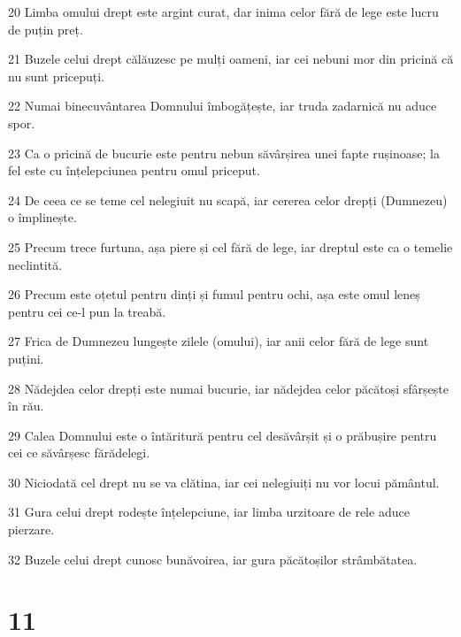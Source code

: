 \par 20 Limba omului drept este argint curat, dar inima celor fără de lege este lucru de puțin preț.
\par 21 Buzele celui drept călăuzesc pe mulți oameni, iar cei nebuni mor din pricină că nu sunt pricepuți.
\par 22 Numai binecuvântarea Domnului îmbogățește, iar truda zadarnică nu aduce spor.
\par 23 Ca o pricină de bucurie este pentru nebun săvârșirea unei fapte rușinoase; la fel este cu înțelepciunea pentru omul priceput.
\par 24 De ceea ce se teme cel nelegiuit nu scapă, iar cererea celor drepți (Dumnezeu) o împlinește.
\par 25 Precum trece furtuna, așa piere și cel fără de lege, iar dreptul este ca o temelie neclintită.
\par 26 Precum este oțetul pentru dinți și fumul pentru ochi, așa este omul leneș pentru cei ce-l pun la treabă.
\par 27 Frica de Dumnezeu lungește zilele (omului), iar anii celor fără de lege sunt puțini.
\par 28 Nădejdea celor drepți este numai bucurie, iar nădejdea celor păcătoși sfârșește în rău.
\par 29 Calea Domnului este o întăritură pentru cel desăvârșit și o prăbușire pentru cei ce săvârșesc fărădelegi.
\par 30 Niciodată cel drept nu se va clătina, iar cei nelegiuiți nu vor locui pământul.
\par 31 Gura celui drept rodește înțelepciune, iar limba urzitoare de rele aduce pierzare.
\par 32 Buzele celui drept cunosc bunăvoirea, iar gura păcătoșilor strâmbătatea.

\chapter{11}

